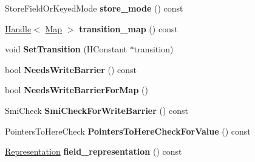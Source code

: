 \begin{DoxyCompactItemize}
\item 
\hypertarget{classv8_1_1internal_1_1_v8___f_i_n_a_l_a9b03eb03a5d3915ded38791d8ec8d81c}{}Store\+Field\+Or\+Keyed\+Mode {\bfseries store\+\_\+mode} () const \label{classv8_1_1internal_1_1_v8___f_i_n_a_l_a9b03eb03a5d3915ded38791d8ec8d81c}

\item 
\hypertarget{classv8_1_1internal_1_1_v8___f_i_n_a_l_a959cadf07fc3df75ab0ec26a93af4f17}{}\hyperlink{classv8_1_1internal_1_1_handle}{Handle}$<$ \hyperlink{classv8_1_1internal_1_1_map}{Map} $>$ {\bfseries transition\+\_\+map} () const \label{classv8_1_1internal_1_1_v8___f_i_n_a_l_a959cadf07fc3df75ab0ec26a93af4f17}

\item 
\hypertarget{classv8_1_1internal_1_1_v8___f_i_n_a_l_a1a35e898cd87eb7842159855661ae860}{}void {\bfseries Set\+Transition} (H\+Constant $\ast$transition)\label{classv8_1_1internal_1_1_v8___f_i_n_a_l_a1a35e898cd87eb7842159855661ae860}

\item 
\hypertarget{classv8_1_1internal_1_1_v8___f_i_n_a_l_a9ff9c596095c8c1a592a035b5187444d}{}bool {\bfseries Needs\+Write\+Barrier} () const \label{classv8_1_1internal_1_1_v8___f_i_n_a_l_a9ff9c596095c8c1a592a035b5187444d}

\item 
\hypertarget{classv8_1_1internal_1_1_v8___f_i_n_a_l_a55df1b454fe1bcc12d85b43523a270d8}{}bool {\bfseries Needs\+Write\+Barrier\+For\+Map} ()\label{classv8_1_1internal_1_1_v8___f_i_n_a_l_a55df1b454fe1bcc12d85b43523a270d8}

\item 
\hypertarget{classv8_1_1internal_1_1_v8___f_i_n_a_l_a2e5d9c4312bc1e4f37ee623c310d2c27}{}Smi\+Check {\bfseries Smi\+Check\+For\+Write\+Barrier} () const \label{classv8_1_1internal_1_1_v8___f_i_n_a_l_a2e5d9c4312bc1e4f37ee623c310d2c27}

\item 
\hypertarget{classv8_1_1internal_1_1_v8___f_i_n_a_l_ad4aa241f78cf3c3f27f390b10f7bdcd2}{}Pointers\+To\+Here\+Check {\bfseries Pointers\+To\+Here\+Check\+For\+Value} () const \label{classv8_1_1internal_1_1_v8___f_i_n_a_l_ad4aa241f78cf3c3f27f390b10f7bdcd2}

\item 
\hypertarget{classv8_1_1internal_1_1_v8___f_i_n_a_l_a08304cdf7117d69b0cf7827fbc46b733}{}\hyperlink{classv8_1_1internal_1_1_representation}{Representation} {\bfseries field\+\_\+representation} () const \label{classv8_1_1internal_1_1_v8___f_i_n_a_l_a08304cdf7117d69b0cf7827fbc46b733}


\end{DoxyCompactItemize}
